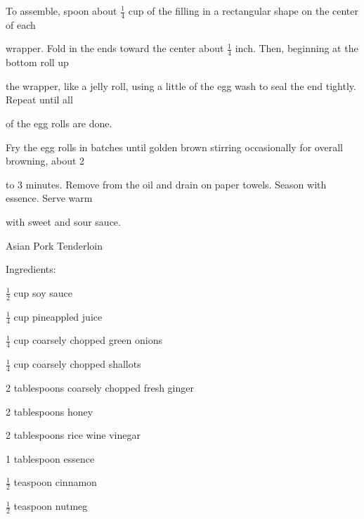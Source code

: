 \documentclass[a4paper,portrait,12pt]{book}
\begin{document}
To assemble, spoon about $\frac{1}{4}$ cup of the filling in a rectangular shape on the center of each




wrapper. Fold in the ends toward the center about $\frac{1}{4}$ inch. Then, beginning at the bottom roll up




the wrapper, like a jelly roll, using a little of the egg wash to seal the end tightly. Repeat until all




of the egg rolls are done.




Fry the egg rolls in batches until golden brown stirring occasionally for overall browning, about 2




to 3 minutes. Remove from the oil and drain on paper towels. Season with essence. Serve warm




with sweet and sour sauce.







\newpage
Asian Pork Tenderloin




Ingredients:




$\frac{1}{2}$ cup soy sauce




$\frac{1}{4}$ cup pineappled juice




$\frac{1}{4}$ cup coarsely chopped green onions




$\frac{1}{4}$ cup coarsely chopped shallots




2 tablespoons coarsely chopped fresh ginger




2 tablespoons honey




2 tablespoons rice wine vinegar




1 tablespoon essence




$\frac{1}{2}$ teaspoon cinnamon




$\frac{1}{2}$ teaspoon nutmeg
\end{document}
